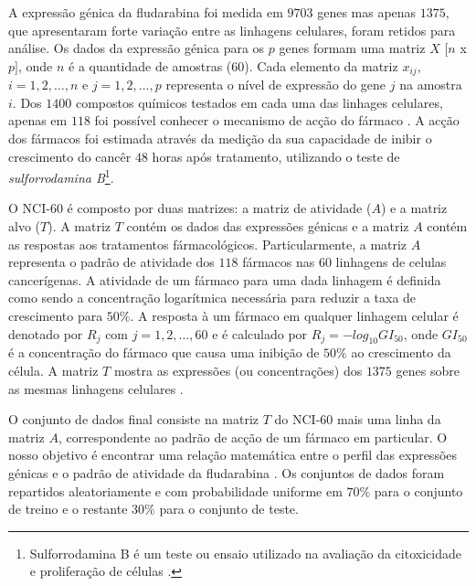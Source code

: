 A expressão génica da fludarabina foi medida em $9703$ genes mas apenas $1375$, que apresentaram forte variação entre as linhagens celulares, 
foram retidos para análise. Os dados da expressão génica para os $p$ genes formam uma matriz $X$ $[n$ x $p]$, onde $n$ é a quantidade de amostras 
($60$). Cada elemento da matriz $x_{ij}$, $i = 1,2,\ldots,n$ e $j=1,2,\ldots,p$ representa o nível de expressão do gene $j$ na amostra $i$. Dos $1400$
compostos químicos testados em cada uma das linhages celulares, apenas em $118$ foi possível conhecer o mecanismo de acção do fármaco \citep{archetti2010genetic2}.
A acção dos fármacos foi estimada através da medição da sua capacidade de inibir o crescimento do cancêr $48$ horas após tratamento, utilizando 
o teste de \emph{sulforrodamina B}\footnote{Sulforrodamina B é um teste ou ensaio utilizado na avaliação da citoxicidade e proliferação de células
\citep{lin1999sulpho}.}.

O NCI-60 é composto por duas matrizes: a matriz de atividade ($A$) e a matriz alvo ($T$). A matriz $T$ contém os dados das expressões génicas
e a matriz $A$ contém as respostas aos tratamentos fármacológicos. Particularmente, a matriz $A$ representa o padrão de atividade dos $118$
fármacos nas $60$ linhagens de celulas cancerígenas. A atividade de um fármaco para uma dada linhagem é definida
como sendo a concentração logarítmica necessária para reduzir a taxa de crescimento para $50\%$. A resposta à um fármaco em qualquer 
linhagem celular é denotado por $R_j$ com $j=1,2,\ldots,60$ e é calculado por $R_j = -log_10GI_50$, onde $GI_50$ é a concentração do
fármaco que causa uma inibição de $50\%$ ao crescimento da célula. A matriz $T$ mostra as expressões (ou concentrações) dos $1375$ genes 
sobre as mesmas linhagens celulares \citep{archetti2010genetic2}. 

O conjunto de dados final consiste na matriz $T$ do NCI-60 mais uma linha da matriz $A$, correspondente ao padrão de acção de um fármaco em particular. 
O nosso objetivo é encontrar uma relação matemática entre o perfil das expressões génicas e o padrão de atividade da fludarabina \citep{archetti2010genetic2}.
Os conjuntos de dados foram repartidos aleatoriamente e com probabilidade uniforme em $70\%$ para o conjunto de treino e o restante $30\%$
para o conjunto de teste.%
